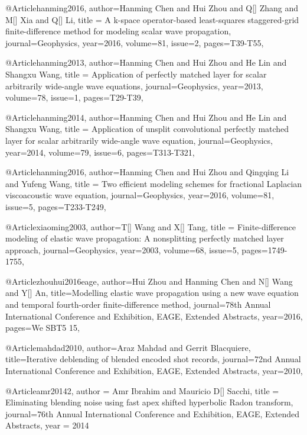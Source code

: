 {@Article{hanming2016,
  author={Hanming Chen and Hui Zhou and Q[] Zhang and M[] Xia and Q[] Li},
  title = {A k-space operator-based least-squares staggered-grid finite-difference method for modeling scalar wave propagation},
  journal={Geophysics},
  year=2016,
  volume=81,
  issue=2,
  pages={T39-T55},
}

@Article{hanming2013,
  author={Hanming Chen and Hui Zhou and He Lin and Shangxu Wang},
  title = {Application of perfectly matched layer for scalar arbitrarily wide-angle wave equations},
  journal={Geophysics},
  year=2013,
  volume=78,
  issue=1,
  pages={T29-T39},
}

@Article{hanming2014,
  author={Hanming Chen and Hui Zhou and He Lin and Shangxu Wang},
  title = {Application of unsplit convolutional perfectly matched layer for scalar arbitrarily wide-angle wave equation},
  journal={Geophysics},
  year=2014,
  volume=79,
  issue=6,
  pages={T313-T321},
}

@Article{hanming2016,
  author={Hanming Chen and Hui Zhou and Qingqing Li and Yufeng Wang},
  title = {Two efficient modeling schemes for fractional Laplacian viscoacoustic wave equation},
  journal={Geophysics},
  year=2016,
  volume=81,
  issue=5,
  pages={T233-T249},
}

@Article{xiaoming2003,
  author={T[] Wang and X[] Tang},
  title = {Finite-difference modeling of elastic wave propagation: A nonsplitting perfectly matched layer approach},
  journal={Geophysics},
  year=2003,
  volume=68,
  issue=5,
  pages={1749-1755},
}

	




@Article{zhouhui2016eage,
  author={Hui Zhou and Hanming Chen and N[] Wang and Y[] An},
  title={Modelling elastic wave propagation using a new wave equation and temporal fourth-order finite-difference  method},
  journal={78th Annual International Conference and Exhibition, EAGE, Extended Abstracts},
  year=2016,
  pages={We SBT5 15},
}



@Article{mahdad2010,
  author={Araz Mahdad and Gerrit Blacquiere},
  title={Iterative deblending of blended encoded shot records},
  journal={72nd Annual International Conference and Exhibition, EAGE, Extended Abstracts},
  year=2010,
}

@Article{amr20142,
  author = 	 {Amr Ibrahim and Mauricio D[] Sacchi},
  title = 	 {Eliminating blending noise using fast apex shifted hyperbolic Radon transform},
  journal={76th Annual International Conference and Exhibition, EAGE, Extended Abstracts},
  year = 	 2014} 
  
}
